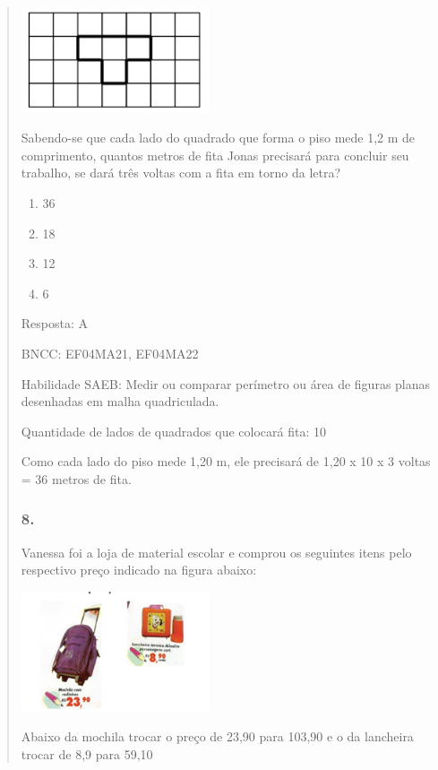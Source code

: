 \begin{enumerate}
\begin{escolha}
\begin{enumerate}
\begin{itemize}
\begin{itemize}
\begin{escolha}
\begin{quote}
\begin{escolha}
{\includegraphics[width=2.17519in,height=1.22511in]{media/image155.png}

Sabendo-se que cada lado do quadrado que forma o piso mede 1,2 m de
comprimento, quantos metros de fita Jonas precisará para concluir seu
trabalho, se dará três voltas com a fita em torno da letra?

\begin{enumerate}
\def\labelenumi{\alph{enumi})}
\item
  36
\item
  18
\item
  12
\item
  6
\end{enumerate}

Resposta: A

BNCC: EF04MA21, EF04MA22

Habilidade SAEB: Medir ou comparar perímetro ou área de figuras planas
desenhadas em malha quadriculada.

Quantidade de lados de quadrados que colocará fita: 10

Como cada lado do piso mede 1,20 m, ele precisará de 1,20 x 10 x 3
voltas = 36 metros de fita.

\subsubsection{8.}\label{section-164}

Vanessa foi a loja de material escolar e comprou os seguintes itens pelo
respectivo preço indicado na figura abaixo:

\includegraphics[width=2.17519in,height=1.39179in]{media/image156.png}

Abaixo da mochila trocar o preço de 23,90 para 103,90 e o da lancheira
trocar de 8,9 para 59,10

}
\end{escolha}
\end{quote}
\end{escolha}
\end{itemize}
\end{itemize}
\end{enumerate}
\end{escolha}
\end{enumerate}
